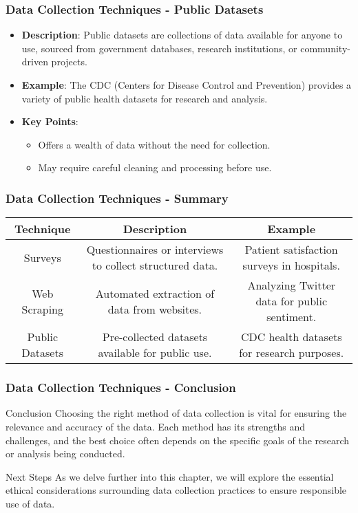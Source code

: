 \documentclass[aspectratio=169]{beamer}
\begin{document}
\begin{frame}[fragile]
    \frametitle{Data Collection Techniques - Public Datasets}
    \begin{itemize}
        \item \textbf{Description}: Public datasets are collections of data available for anyone to use, sourced from government databases, research institutions, or community-driven projects.
        \item \textbf{Example}: The CDC (Centers for Disease Control and Prevention) provides a variety of public health datasets for research and analysis.
        \item \textbf{Key Points}:
        \begin{itemize}
            \item Offers a wealth of data without the need for collection.
            \item May require careful cleaning and processing before use.
        \end{itemize}
    \end{itemize}
\end{frame}

\begin{frame}[fragile]
    \frametitle{Data Collection Techniques - Summary}
    \begin{center}
    \begin{tabular}{|c|c|c|}
        \hline
        \textbf{Technique} & \textbf{Description} & \textbf{Example}  \\
        \hline
        Surveys & Questionnaires or interviews to collect structured data. & Patient satisfaction surveys in hospitals. \\
        \hline
        Web Scraping & Automated extraction of data from websites. & Analyzing Twitter data for public sentiment. \\
        \hline
        Public Datasets & Pre-collected datasets available for public use. & CDC health datasets for research purposes. \\
        \hline
    \end{tabular}
    \end{center}
\end{frame}

\begin{frame}[fragile]
    \frametitle{Data Collection Techniques - Conclusion}
    \begin{block}{Conclusion}
        Choosing the right method of data collection is vital for ensuring the relevance and accuracy of the data. Each method has its strengths and challenges, and the best choice often depends on the specific goals of the research or analysis being conducted.
    \end{block}
    
    \begin{block}{Next Steps}
        As we delve further into this chapter, we will explore the essential ethical considerations surrounding data collection practices to ensure responsible use of data.
    \end{block}
\end{frame}
\end{document}
